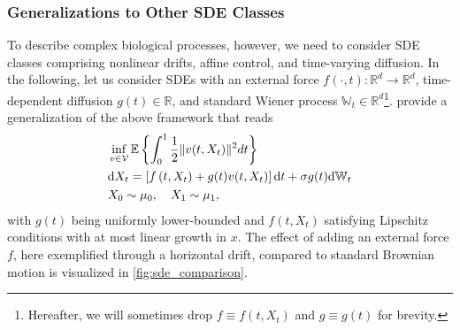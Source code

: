 \subsubsection*{Generalizations to Other SDE Classes}
To describe complex biological processes, however, we need to consider SDE classes comprising nonlinear drifts, affine control, and time-varying diffusion. 
In the following, let us consider SDEs with an external force $f(\cdot, t): \mathbb{R}^d \rightarrow \mathbb{R}^d$, time-dependent diffusion $g(t) \in \mathbb{R}$, and standard Wiener process $\mathbb{W}_t \in \mathbb{R}^d$\footnote{Hereafter, we will sometimes drop $f \equiv f(t, X_t)$ and $g \equiv g(t)$ for brevity.}. \citet{caluya2021wasserstein, chen2021likelihood} provide a generalization of the above framework that reads
\begin{align}
\label{eq:sb_control_gen}
& \inf _{v \in \mathcal{V}} \mathbb{E}\left\{\int_0^1 \frac{1}{2}\lVert v(t, X_t)\rVert^2 d t\right\}\\
\label{eq:sb_control_constraint_gen}
& \mathrm{d} X_t=\left[f\left(t, X_t\right)+g(t) v(t, X_t)\right] \mathrm{d} t+\sigma g(t) \mathrm{d} \mathbb{W}_t
 \\
\nonumber & X_0 \sim \mu_0, \quad X_1 \sim \mu_1,
\end{align}
with $g(t)$ being uniformly lower-bounded and $f(t, X_t)$ satisfying Lipschitz conditions with at most linear growth in $x$.
The effect of adding an external force $f$, here exemplified through a horizontal drift, compared to standard Brownian motion is visualized in \cref{fig:sde_comparison}.

